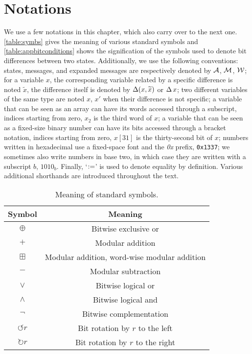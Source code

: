 \section{Notations}
\label{sec:not}

We use a few notations in this chapter, which also carry over to the next one.
\autoref{table:symbs} gives the meaning of various standard symbols and \autoref{table:appbitconditions} shows the signification of the symbols used to denote bit differences between two states.
Additionally, we use the following conventions: \shaone states, messages, and expanded messages are respectively denoted by $\mathcal{A}$, $\mathcal{M}$, $\mathcal{W}$; for a variable $x$, the corresponding variable related by a specific
difference is noted $\widetilde{x}$, the difference itself is denoted by $\operatorname{\Delta}(x,\widetilde{x})$ or $\operatorname{\Delta} x$; two different variables of the same type are noted $x$, $x'$ when their difference is not specific;
a variable that can be seen as an array can have its words accessed through a subscript, indices starting from zero, \eg $x_2$ is the third word of $x$; a variable that can be seen as a fixed-size binary number
can have its bits accessed through a bracket notation, indices starting from zero, \eg $x[31]$ is the thirty-second bit of $x$; 
numbers written in hexadecimal use a fixed-space font and the \emph{0x} prefix, \eg \texttt{0x1337}; we sometimes also write numbers in base two, in which case they are written with a subscript $b$, \eg $1010_b$. Finally, `$:=$' is used to denote equality by definition.
Various additional shorthands are introduced throughout the text.

\begin{table}[!htb]
\caption{Meaning of standard symbols.}\label{table:symbs}
\begin{center}
\begin{tabular}{c c}
\toprule
Symbol & Meaning\\
\midrule
$\oplus$ & Bitwise exclusive or\\
$+$ & Modular addition\\
$\boxplus$ & Modular addition, word-wise modular addition\\
$-$ & Modular subtraction\\
$\vee$ & Bitwise logical or\\
$\wedge$ & Bitwise logical and\\
$\neg$ & Bitwise complementation\\
$\circlearrowleft r$ & Bit rotation by $r$ to the left\\
$\circlearrowright r$ & Bit rotation by $r$ to the right\\
\bottomrule
\end{tabular}
\end{center}
\end{table}

